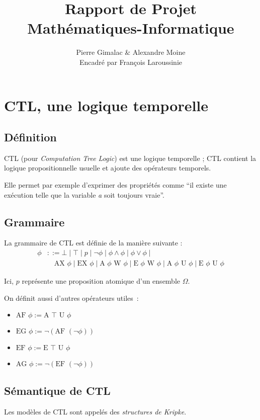 \documentclass[10pt,a4paper]{article}
\author{Pierre Gimalac \& Alexandre Moine\\\small{Encadré par François Laroussinie}}
\title{Rapport de Projet\\Mathématiques-Informatique}
\begin{document}
\maketitle

\section{CTL, une logique temporelle}
\subsection{Définition}
CTL (pour \textit{Computation Tree Logic}) est une logique temporelle ; CTL contient la logique propositionnelle usuelle et ajoute des opérateurs temporels.

Elle permet par exemple d'exprimer des propriétés comme ``il existe une exécution telle que la variable \textit{a} soit toujours vraie''.

\subsection{Grammaire}
La grammaire de CTL est définie de la manière suivante :
\begin{align*}
\phi &::= \bot \mid \top \mid p \mid \neg \phi \mid \phi\land\phi \mid \phi\lor\phi \mid \\
&\quad \mbox{AX }\phi \mid \mbox{EX }\phi \mid
\mbox{A }\phi \mbox{ W } \phi \mid \mbox{E }\phi \mbox{ W } \phi \mid
\mbox{A }\phi \mbox{ U } \phi \mid \mbox{E }\phi \mbox{ U } \phi
\end{align*}

Ici, $p$ représente une proposition atomique d'un ensemble $\Omega$.

On définit aussi d'autres opérateurs utiles :
\begin{itemize}
	\item $\mbox{AF } \phi := \mbox{A } \top \mbox{ U } \phi$
	\item $\mbox{EG } \phi := \neg (\mbox{AF } (\neg \phi))$
	\item $\mbox{EF } \phi := \mbox{E } \top \mbox{ U } \phi$
	\item $\mbox{AG } \phi := \neg (\mbox{EF } (\neg \phi))$
\end{itemize}

\subsection{Sémantique de CTL}
Les modèles de CTL sont appelés des \emph{structures de Kripke}.
\end{document}
